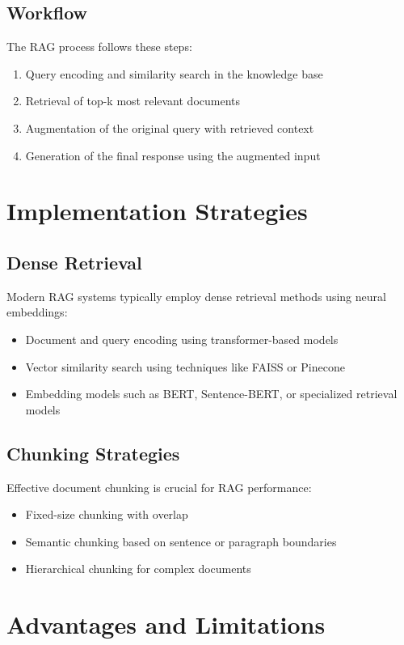 \documentclass[]{article}
\begin{document}
\subsection{Workflow}
The RAG process follows these steps:
\begin{enumerate}
    \item Query encoding and similarity search in the knowledge base
    \item Retrieval of top-k most relevant documents
    \item Augmentation of the original query with retrieved context
    \item Generation of the final response using the augmented input
\end{enumerate}

\section{Implementation Strategies}

\subsection{Dense Retrieval}
Modern RAG systems typically employ dense retrieval methods using neural embeddings:
\begin{itemize}
    \item Document and query encoding using transformer-based models
    \item Vector similarity search using techniques like FAISS or Pinecone
    \item Embedding models such as BERT, Sentence-BERT, or specialized retrieval models
\end{itemize}

\subsection{Chunking Strategies}
Effective document chunking is crucial for RAG performance:
\begin{itemize}
    \item Fixed-size chunking with overlap
    \item Semantic chunking based on sentence or paragraph boundaries
    \item Hierarchical chunking for complex documents
\end{itemize}

\section{Advantages and Limitations}
\end{document}

